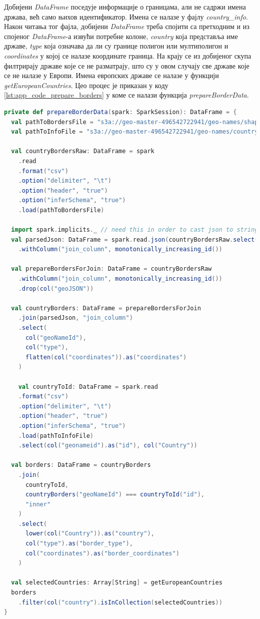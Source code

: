 \documentclass[12pt,oneside]{memoir}
\begin{document}
Добијени \textit{DataFrame} поседује информације о границама, али не садржи имена држава, већ само њихов идентификатор. Имена се налазе у фајлу \textit{country\_info}. Након читања тог фајла, добијени \textit{DataFrame} треба спојити са претходним и из спојеног \textit{DataFrame}-а извући потребне колоне, \textit{country} која представља име државе, \textit{type} која означава да ли су границе полигон или мултиполигон и \textit{coordinates} у којој се налазе координате граница. На крају се из добијеног скупа филтрирају државе које се не разматрају, што су у овом случају све државе које се не налазе у Европи. Имена европских државе се налазе у функцији \textit{getEuropeanCountries}. Цео процес је приказан у коду \ref{lst:app_code_prepare_borders} у коме се налази функција \textit{prepareBorderData}.

\begin{lstlisting}[caption={Функција која припрема \textit{DataFrame} у коме се налазе информације о границама држава}, language=Scala, label={lst:app_code_prepare_borders}]
private def prepareBorderData(spark: SparkSession): DataFrame = {
  val pathToBordersFile = "s3a://geo-master-496542722941/geo-names/shapes_all_low.txt"
  val pathToInfoFile = "s3a://geo-master-496542722941/geo-names/country_info.txt"

  val countryBordersRaw: DataFrame = spark
    .read
    .format("csv")
    .option("delimiter", "\t")
    .option("header", "true")
    .option("inferSchema", "true")
    .load(pathToBordersFile)

  import spark.implicits._ // need this in order to cast json to string
  val parsedJson: DataFrame = spark.read.json(countryBordersRaw.select(col("geoJSON")).as[String])
    .withColumn("join_column", monotonically_increasing_id())

  val prepareBordersForJoin: DataFrame = countryBordersRaw
    .withColumn("join_column", monotonically_increasing_id())
    .drop(col("geoJSON"))

  val countryBorders: DataFrame = prepareBordersForJoin
    .join(parsedJson, "join_column")
    .select(
      col("geoNameId"),
      col("type"),
      flatten(col("coordinates")).as("coordinates")
    )

    val countryToId: DataFrame = spark.read
    .format("csv")
    .option("delimiter", "\t")
    .option("header", "true")
    .option("inferSchema", "true")
    .load(pathToInfoFile)
    .select(col("geonameid").as("id"), col("Country"))

  val borders: DataFrame = countryBorders
    .join(
      countryToId,
      countryBorders("geoNameId") === countryToId("id"),
      "inner"
    )
    .select(
      lower(col("Country")).as("country"),
      col("type").as("border_type"),
      col("coordinates").as("border_coordinates")
    )

  val selectedCountries: Array[String] = getEuropeanCountries
  borders
    .filter(col("country").isInCollection(selectedCountries))
}
\end{lstlisting}
\end{document}
